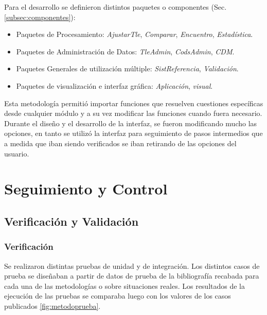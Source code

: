 Para el desarrollo se definieron distintos paquetes o componentes (Sec. \ref{subsec:componentes}):\\

\begin{itemize}
\itemsep0em
 \item Paquetes de Procesamiento: {\it{AjustarTle}}, {\it{Comparar}}, {\it{Encuentro}}, {\it{Estad\'istica}}.
 \item Paquetes de Administraci\'on de Datos: {\it{TleAdmin}}, {\it{CodsAdmin}}, {\it{CDM}}.
 \item Paquetes Generales de utilizaci\'on m\'ultiple: {\it{SistReferencia}}, {\it{Validaci\'on}}.
 \item Paquetes de visualizaci\'on e interfaz gr\'afica: {\it{Aplicaci\'on}}, {\it{visual}}.
\end{itemize}

Esta metodolog\'ia permiti\'o importar funciones que resuelven cuestiones espec\'ificas desde cualquier  m\'odulo y a su vez modificar las funciones cuando fuera necesario.\\

Durante el diseño y el desarrollo de la interfaz, se fueron modificando mucho las opciones, en tanto se utiliz\'o la interfaz para seguimiento de pasos intermedios que a medida que iban siendo verificados se iban retirando de las opciones del usuario.\\

\section{Seguimiento y Control}

\subsection{Verificaci\'on y Validaci\'on}

\subsubsection*{Verificaci\'on}
Se realizaron distintas pruebas de unidad y de integraci\'on.  
Los distintos casos de prueba se diseñaban a partir de datos de prueba de la bibliograf\'ia recabada para cada una de las metodolog\'ias o sobre situaciones reales. Los resultados de la ejecución de las pruebas se comparaba luego con los valores de  los casos publicados \ref{fig:metodoprueba}. 

